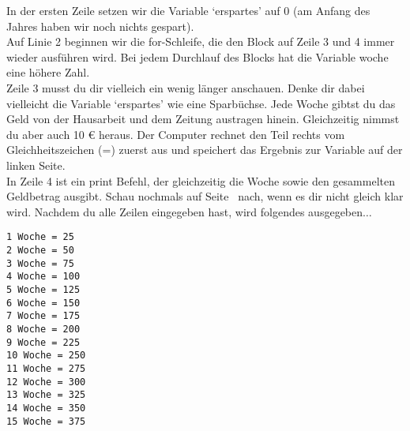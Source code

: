 In der ersten Zeile setzen wir die Variable `erspartes' auf 0 (am Anfang des Jahres haben wir noch nichts gespart).\\
Auf Linie 2 beginnen wir die for-Schleife, die den Block auf Zeile 3 und 4 immer wieder ausführen wird. Bei jedem Durchlauf des Blocks hat die Variable woche eine höhere Zahl.\\
Zeile 3 musst du dir vielleich ein wenig länger anschauen. Denke dir dabei vielleicht die Variable `erspartes' wie eine Sparbüchse. Jede Woche gibtst du das Geld von der Hausarbeit und dem Zeitung austragen hinein. Gleichzeitig nimmst du aber auch 10 € heraus. Der Computer rechnet den Teil rechts vom Gleichheitszeichen (=) zuerst aus und speichert das Ergebnis zur Variable auf der linken Seite.\\
In Zeile 4 ist ein print Befehl, der gleichzeitig die Woche sowie den gesammelten Geldbetrag ausgibt. Schau nochmals auf Seite~\pageref{trickswithstrings} nach, wenn es dir nicht gleich klar wird. Nachdem du alle Zeilen eingegeben hast, wird folgendes ausgegeben\texorpdfstring{$\ldots$}{...}

\begin{Verbatim}[frame=single]
1 Woche = 25
2 Woche = 50
3 Woche = 75
4 Woche = 100
5 Woche = 125
6 Woche = 150
7 Woche = 175
8 Woche = 200
9 Woche = 225
10 Woche = 250
11 Woche = 275
12 Woche = 300
13 Woche = 325
14 Woche = 350
15 Woche = 375
\end{Verbatim}

